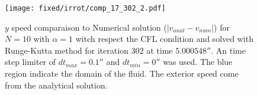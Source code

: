 \begin{figure}
\texttt{[image: fixed/irrot/comp\_17\_302\_2.pdf]}
\caption{$y$ speed comparaison to Numerical solution ($|v_{anal}-v_{num}|$) for $N=10$ with $\alpha=1$ witch respect the CFL condition and solved with Runge-Kutta method
for iteration 302 at time $\unit{5.000548}{\second}$.
An time step limiter of $dt_{max}=\unit{0.1}{\second}$ and $dt_{min}=\unit{0}{\second}$ was used.
The blue region indicate the domain of the fluid. The exterior speed come from the analytical solution.
\label{fix:comp_17_302_2}
}
\end{figure}